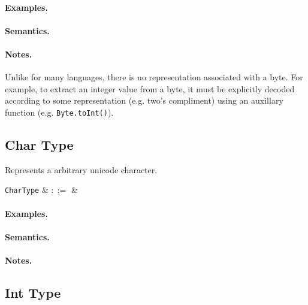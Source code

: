 \paragraph{Examples.}

\paragraph{Semantics.}

\paragraph{Notes.}  Unlike for many languages, there is no
representation associated with a byte. For example, to extract an
integer value from a byte, it must be explicitly decoded according to
some representation (e.g. two's compliment) using an auxillary function (e.g. \lstinline{Byte.toInt()}).



\subsection{Char Type}

Represents a arbitrary unicode character.

\begin{syntax}
  \verb+CharType+ & $::=$ &  \\
\end{syntax}

\paragraph{Examples.}

\paragraph{Semantics.}

\paragraph{Notes.} 


\subsection{Int Type}

